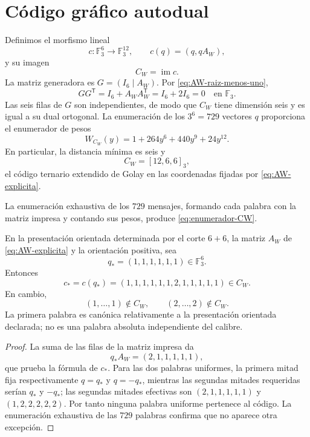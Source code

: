 \section{Código gráfico autodual}

Definimos el morfismo lineal
\[
 c:\mathbb F_3^6\longrightarrow\mathbb F_3^{12},
 \qquad c(q)=(q,qA_W),
\]
y su imagen
\[
 C_W=\operatorname{im}c.
\]
La matriz generadora es \(G=(I_6\mid A_W)\). Por
\eqref{eq:AW-raiz-menos-uno},
\[
 GG^{\mathsf T}=I_6+A_WA_W^{\mathsf T}=I_6+2I_6=0
 \quad\text{en }\mathbb F_3.
\]
Las seis filas de \(G\) son independientes, de modo que \(C_W\) tiene
dimensión seis y es igual a su dual ortogonal. La enumeración de los
\(3^6=729\) vectores \(q\) proporciona el enumerador de pesos
\begin{equation}
 W_{C_W}(y)=1+264y^6+440y^9+24y^{12}.
 \label{eq:enumerador-CW}
\end{equation}
En particular, la distancia mínima es seis y
\[
 C_W=[12,6,6]_3,
\]
el código ternario extendido de Golay en las coordenadas fijadas por
\eqref{eq:AW-explicita}.

La enumeración exhaustiva de los \(729\) mensajes, formando cada palabra con
la matriz impresa y contando sus pesos, produce
\eqref{eq:enumerador-CW}.

\begin{proposition}
\label{prop:palabra-marcada-witt}
En la presentación orientada determinada por el corte \(6+6\), la matriz
\(A_W\) de \eqref{eq:AW-explicita} y la orientación positiva, sea
\[
q_\ast=(1,1,1,1,1,1)\in\mathbb F_3^6.
\]
Entonces
\[
\boxed{
c_\ast=c(q_\ast)
=(1,1,1,1,1,1,2,1,1,1,1,1)\in C_W.}
\]
En cambio,
\[
(1,\ldots,1)\notin C_W,
\qquad
(2,\ldots,2)\notin C_W.
\]
La primera palabra es canónica relativamente a la presentación orientada
declarada; no es una palabra absoluta independiente del calibre.
\end{proposition}

\begin{proof}
La suma de las filas de la matriz impresa da
\[
q_\ast A_W=(2,1,1,1,1,1),
\]
que prueba la fórmula de \(c_\ast\). Para las dos palabras uniformes, la
primera mitad fija respectivamente \(q=q_\ast\) y \(q=-q_\ast\), mientras
las segundas mitades requeridas serían \(q_\ast\) y \(-q_\ast\); las
segundas mitades efectivas son
\((2,1,1,1,1,1)\) y \((1,2,2,2,2,2)\). Por tanto ninguna palabra uniforme
pertenece al código. La enumeración exhaustiva de las \(729\) palabras
confirma que no aparece otra excepción.
\end{proof}

